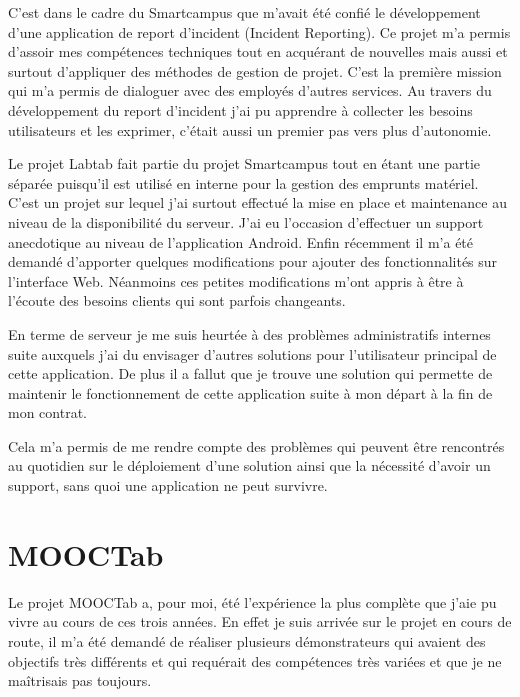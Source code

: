 \documentclass[french,12pt,a4paper,titlepage,openright,openbib]{report}
\begin{document}
C'est dans le cadre du Smartcampus que m'avait été confié le développement d'une application de report d'incident (Incident Reporting). Ce projet m'a permis d'assoir mes compétences techniques tout en acquérant de nouvelles mais aussi et surtout d'appliquer des méthodes de gestion de projet. C'est la première mission qui m'a permis de dialoguer avec des employés d'autres services. Au travers du développement du report d'incident j'ai pu apprendre à collecter les besoins utilisateurs et les exprimer, c'était aussi un premier pas vers plus d'autonomie.



Le projet Labtab fait partie du projet Smartcampus tout en étant une partie séparée puisqu'il est utilisé en interne pour la gestion des emprunts matériel. C'est un projet sur lequel j'ai surtout effectué la mise en place et maintenance au niveau de la disponibilité du serveur.
J'ai eu l'occasion d'effectuer un support anecdotique au niveau de l'application Android. Enfin récemment il m'a été demandé d'apporter quelques modifications pour ajouter des fonctionnalités sur l'interface Web. Néanmoins ces petites modifications m'ont appris à être à l'écoute des besoins clients qui sont parfois changeants.

En terme de serveur je me suis heurtée à des problèmes administratifs internes suite auxquels j'ai du envisager d'autres solutions pour l'utilisateur principal de cette application. De plus il a fallut que je trouve une solution qui permette de maintenir le fonctionnement de cette application suite à mon départ à la fin de mon contrat. 

Cela m'a permis de me rendre compte des problèmes qui peuvent être rencontrés au quotidien sur le déploiement d'une solution ainsi que la nécessité d'avoir un support, sans quoi une application ne peut survivre.


\section{MOOCTab}

Le projet MOOCTab a, pour moi, été l'expérience la plus complète que j'aie pu  vivre au cours de ces trois années. En effet je suis arrivée sur le projet en cours de route, il m'a été demandé de réaliser plusieurs démonstrateurs qui avaient des objectifs très différents et qui requérait des compétences très variées et que je ne maîtrisais pas toujours.
\end{document}
